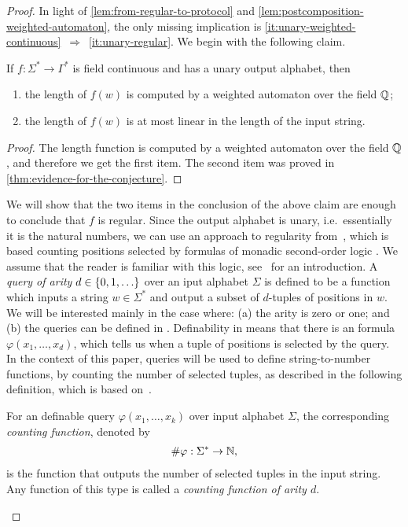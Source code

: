 \begin{proof}
In light of \cref{lem:from-regular-to-protocol} and \cref{lem:postcomposition-weighted-automaton},  the only missing implication is \ref{it:unary-weighted-continuous}~$\Rightarrow$~\ref{it:unary-regular}.  We begin with the following claim. 

\begin{claim}\label{claim:unary-output-alphabet-basic-consequences}
    If $f :\Sigma^* \to \Gamma^*$ is field continuous and has a unary output alphabet, then 
        \begin{enumerate}
        \item \label{it:unary-computed-by-weighted} the length of $f(w)$ is  computed by a weighted automaton over the field ${\mathbb Q}$;
        \item \label{it:unary-linear-output-size} the length of $f(w)$ is  at most linear in the length of the input string.
    \end{enumerate}
\end{claim}
\begin{proof}
    The length function is computed by a weighted automaton over the field ${\mathbb Q}$, and therefore we get the first item. The second item was proved in \cref{thm:evidence-for-the-conjecture}.
\end{proof}

We will show that the two items in the conclusion of the above claim are  enough to conclude that $f$ is  regular. Since the output alphabet is unary, i.e.~essentially it is the natural numbers, we can use an approach to regularity from~\cite{Zpolyreg23}, which is based counting positions selected by formulas of  monadic second-order logic \mso. We assume that the reader is familiar with this logic, see~\cite[Section 2.1]{bojanczyk_recobook} for an introduction. 
A \emph{query of arity $d \in \{0,1,\ldots\}$} 
over an iput alphabet $\Sigma$ is defined to be a function which inputs a string  $w \in \Sigma^*$ and output a subset of $d$-tuples of positions in $w$.
 We will be interested mainly in the case where: (a) the arity is zero or one; and (b) the queries  can be defined in \mso. Definability in \mso means that there is an \mso formula $\varphi(x_1,\ldots,x_d)$, which tells us when a tuple of positions is selected by the query. 
In the context of this paper, queries will be used to define string-to-number functions, by counting the number of selected tuples, as described in the  following definition, which is based on~\cite{Zpolyreg23}.


\begin{definition}
       For an \mso definable query $\varphi(x_1,\ldots,x_k)$ over input alphabet $\Sigma$, the corresponding \emph{counting function}, denoted by
    \begin{align*}
    \#{\varphi} : \Sigma^* \to {\mathbb N},
    \end{align*}
    is the function that outputs the number of selected tuples in the input string. Any function of this type is called a \emph{\mso counting function of arity $d$}.
\end{definition}


\end{proof}
